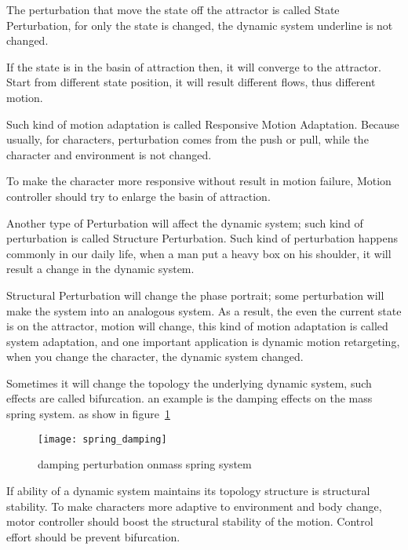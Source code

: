 \begin{itemize}

The perturbation that move the state off the attractor is called State Perturbation, for only the state is changed, the dynamic system underline is not changed.


If the state is in the basin of attraction then, it will converge to the attractor. 
Start from different state position, it will result different flows, thus different motion.

Such kind of motion adaptation is called Responsive Motion Adaptation.
Because usually, for characters, perturbation comes from the push or pull, while the character and environment is not changed.

To make the character more responsive without result in motion failure,
Motion controller should try to enlarge the basin of attraction.







Another type of Perturbation will affect the dynamic system; such kind of perturbation is called Structure Perturbation. 
Such kind of perturbation happens commonly in our daily life, when a man put a heavy box on his shoulder, it will result a change in the dynamic system.

Structural Perturbation will change the phase portrait; some perturbation will make the system into an analogous system.
As a result, the even the current state is on the attractor, motion will change, this kind of motion adaptation is called system adaptation, and one important application is dynamic motion retargeting, when you change the character, the dynamic system changed.

Sometimes it will change the topology the underlying dynamic system, such effects are called bifurcation.
an example is the damping effects on the mass spring system.
as show in figure~\ref{fig:dampmass}

\begin{figure}
\begin{center}
\texttt{[image: spring\_damping]}
\end{center}
\caption{damping perturbation onmass spring system}
\label{fig:dampmass}
\end{figure}

If ability of a dynamic system maintains its topology structure is structural stability.
To make characters more adaptive to environment and body change, motor controller should boost the structural stability of the motion.
Control effort should be prevent bifurcation.
\end{itemize}


